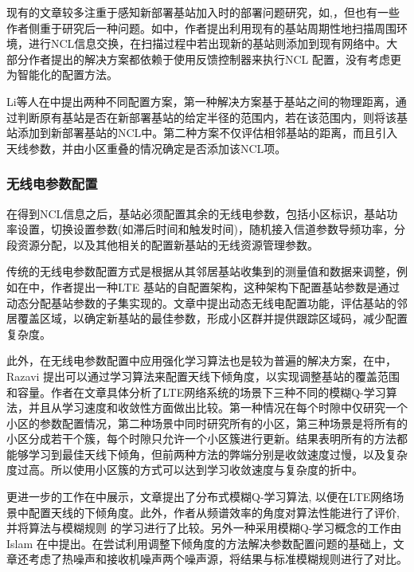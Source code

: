 \documentclass{IEEEtran}
\begin{document}
现有的文章较多注重于感知新部署基站加入时的部署问题研究，如\cite{Lee2014},\cite{Kim2010}，但也有一些作者侧重于研究后一种问题。如\cite{Wainio2016}中，作者提出利用现有的基站周期性地扫描周围环境，进行NCL信息交换，在扫描过程中若出现新的基站则添加到现有网络中。大部分作者提出的解决方案都依赖于使用反馈控制器来执行NCL 配置，没有考虑更为智能化的配置方法。

Li等人在\cite{Li2007}中提出两种不同配置方案，第一种解决方案基于基站之间的物理距离，通过判断原有基站是否在新部署基站的给定半径的范围内，若在该范围内，则将该基站添加到新部署基站的NCL中。第二种方案不仅评估相邻基站的距离，而且引入天线参数，并由小区重叠的情况确定是否添加该NCL项。


\subsubsection{无线电参数配置}
在得到NCL信息之后，基站必须配置其余的无线电参数，包括小区标识，基站功率设置，切换设置参数(如滞后时间和触发时间)，随机接入信道参数导频功率，分段资源分配，以及其他相关的配置新基站的无线资源管理参数。

传统的无线电参数配置方式是根据从其邻居基站收集到的测量值和数据来调整，例如在\cite{Sanneck2010}中，作者提出一种LTE 基站的自配置架构，这种架构下配置基站参数是通过动态分配基站参数的子集实现的。文章中提出动态无线电配置功能，评估基站的邻居覆盖区域，以确定新基站的最佳参数，形成小区群并提供跟踪区域码，减少配置复杂度。

此外，在无线电参数配置中应用强化学习算法也是较为普遍的解决方案，在\cite{Razavi2010}中，Razavi 提出可以通过学习算法来配置天线下倾角度，以实现调整基站的覆盖范围和容量。作者在文章具体分析了LTE网络系统的场景下三种不同的模糊Q-学习算法，并且从学习速度和收敛性方面做出比较。第一种情况在每个时隙中仅研究一个小区的参数配置情况，第二种场景中同时研究所有的小区，第三种场景是将所有的小区分成若干个簇，每个时隙只允许一个小区簇进行更新。结果表明所有的方法都能够学习到最佳天线下倾角，但前两种方法的弊端分别是收敛速度过慢，以及复杂度过高。所以使用小区簇的方式可以达到学习收敛速度与复杂度的折中。

更进一步的工作在\cite{Razavi2010a}中展示，文章提出了分布式模糊Q-学习算法, 以便在LTE网络场景中配置天线的下倾角度。此外，作者从频谱效率的角度对算法性能进行了评价, 并将算法与模糊规则 的学习进行了比较。另外一种采用模糊Q-学习概念的工作由Islam 在\cite{Islam2012}中提出。在尝试利用调整下倾角度的方法解决参数配置问题的基础上，文章还考虑了热噪声和接收机噪声两个噪声源，将结果与标准模糊规则进行了对比。

\end{document}
